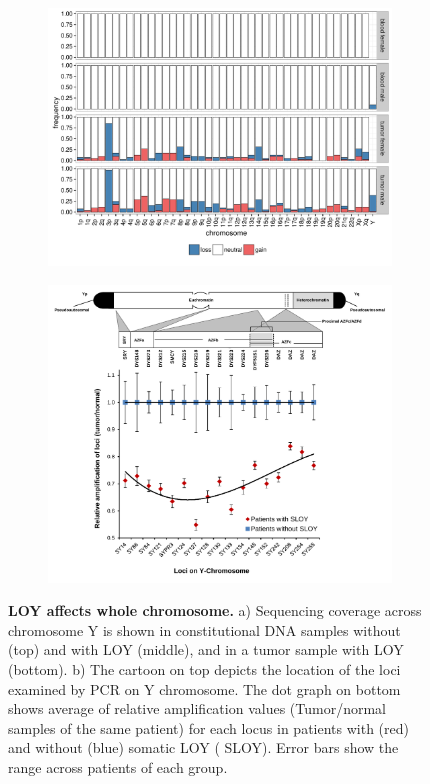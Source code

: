 \begin{figure}[htp]
  \begin{subfigure}[b]{\linewidth}
    \centering
    \includegraphics[width=.7\linewidth, page=3]{figures/Cagekid-LOY-fig.pdf}
    \caption{}
    \label{fig:loy2a}
  \end{subfigure}
  \begin{subfigure}[b]{\linewidth}
    \centering
    \includegraphics[width=.8\linewidth]{figures/LOY-fig2b.pdf}
    \caption{}
    \label{fig:loy2b}
  \end{subfigure}
  \caption[LOY affects whole chromosome.]{{\bf LOY affects whole chromosome.} {\small a) Sequencing coverage across chromosome Y is shown in constitutional DNA samples without (top) and with LOY (middle), and in a tumor sample with LOY (bottom).
b) The cartoon on top depicts the location of the loci examined by PCR on Y chromosome.
The dot graph on bottom shows average of relative amplification values (Tumor/normal samples of the same patient) for each locus in patients with (red) and without (blue) somatic LOY (
SLOY).
Error bars show the range across patients of each group.}}
\end{figure}


